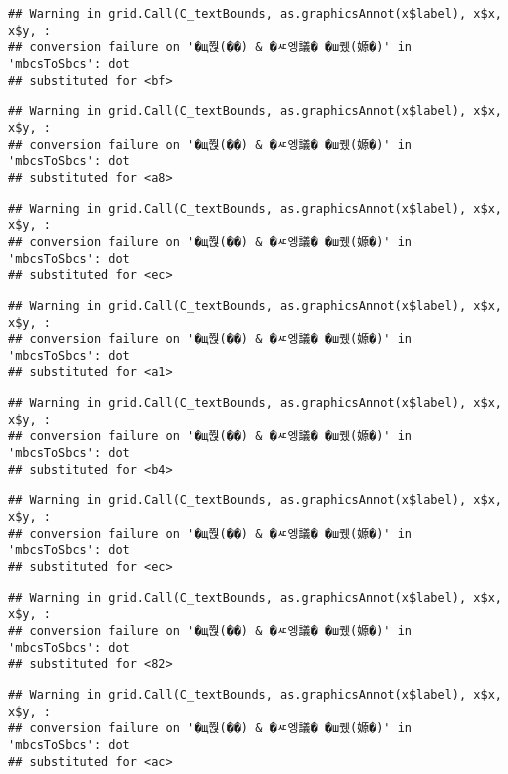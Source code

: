 \documentclass[
]{article}
\begin{document}
\begin{verbatim}
## Warning in grid.Call(C_textBounds, as.graphicsAnnot(x$label), x$x, x$y, :
## conversion failure on '�щ쭩(��) & �ㅼ엥議� �ш퀬(嫄�)' in 'mbcsToSbcs': dot
## substituted for <bf>
\end{verbatim}

\begin{verbatim}
## Warning in grid.Call(C_textBounds, as.graphicsAnnot(x$label), x$x, x$y, :
## conversion failure on '�щ쭩(��) & �ㅼ엥議� �ш퀬(嫄�)' in 'mbcsToSbcs': dot
## substituted for <a8>
\end{verbatim}

\begin{verbatim}
## Warning in grid.Call(C_textBounds, as.graphicsAnnot(x$label), x$x, x$y, :
## conversion failure on '�щ쭩(��) & �ㅼ엥議� �ш퀬(嫄�)' in 'mbcsToSbcs': dot
## substituted for <ec>
\end{verbatim}

\begin{verbatim}
## Warning in grid.Call(C_textBounds, as.graphicsAnnot(x$label), x$x, x$y, :
## conversion failure on '�щ쭩(��) & �ㅼ엥議� �ш퀬(嫄�)' in 'mbcsToSbcs': dot
## substituted for <a1>
\end{verbatim}

\begin{verbatim}
## Warning in grid.Call(C_textBounds, as.graphicsAnnot(x$label), x$x, x$y, :
## conversion failure on '�щ쭩(��) & �ㅼ엥議� �ш퀬(嫄�)' in 'mbcsToSbcs': dot
## substituted for <b4>
\end{verbatim}

\begin{verbatim}
## Warning in grid.Call(C_textBounds, as.graphicsAnnot(x$label), x$x, x$y, :
## conversion failure on '�щ쭩(��) & �ㅼ엥議� �ш퀬(嫄�)' in 'mbcsToSbcs': dot
## substituted for <ec>
\end{verbatim}

\begin{verbatim}
## Warning in grid.Call(C_textBounds, as.graphicsAnnot(x$label), x$x, x$y, :
## conversion failure on '�щ쭩(��) & �ㅼ엥議� �ш퀬(嫄�)' in 'mbcsToSbcs': dot
## substituted for <82>
\end{verbatim}

\begin{verbatim}
## Warning in grid.Call(C_textBounds, as.graphicsAnnot(x$label), x$x, x$y, :
## conversion failure on '�щ쭩(��) & �ㅼ엥議� �ш퀬(嫄�)' in 'mbcsToSbcs': dot
## substituted for <ac>
\end{verbatim}
\end{document}
